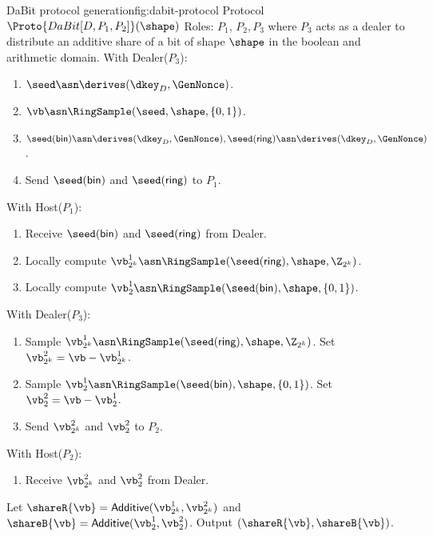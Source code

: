 \begin{Boxfig}{DaBit protocol generation}{fig:dabit-protocol}
  {Protocol $\Proto{DaBit[D, P_1, P_2]}(\shape)$}
  Roles: $P_1$, $P_2, P_3$ where $P_3$ acts as a dealer to distribute
  an additive share of a bit of shape $\shape$ in the boolean and arithmetic domain. \newline
  With Dealer($P_3$):
  \begin{enumerate}
    \item $\seed \asn \derives(\dkey_D, \GenNonce)$.
    \item $\vb \asn \RingSample(\seed, \shape, \{0, 1\})$.
    \item $\seed(\textsf{bin}) \asn \derives(\dkey_D, \GenNonce), \seed(\textsf{ring}) \asn \derives(\dkey_D, \GenNonce)$.
    \item Send $\seed(\textsf{bin})$ and $\seed(\textsf{ring})$ to $P_1$.

  \end{enumerate}
 With Host($P_1$):
 \begin{enumerate}
     \item Receive $\seed(\textsf{bin})$ and $\seed(\textsf{ring})$ from Dealer.
     \item Locally compute $\vb^1_{2^k} \asn \RingSample(\seed(\textsf{ring}), \shape, \Z_{2^k})$.
     \item Locally compute $\vb^1_{2} \asn \RingSample(\seed(\textsf{bin}), \shape, \{0, 1\})$.
 \end{enumerate}
With Dealer($P_3$):
\begin{enumerate}
    \item Sample $\vb^1_{2^k} \asn \RingSample(\seed(\textsf{ring}), \shape, \Z_{2^k})$. Set $\vb^2_{2^k} = \vb - \vb^1_{2^k}$.
    \item Sample $\vb^1_{2} \asn \RingSample(\seed(\textsf{bin}), \shape, \{0, 1\})$. Set $\vb^2_{2} = \vb - \vb^1_{2}$. 
    \item Send $\vb^2_{2^k}$ and $\vb^2_2$ to $P_2$.
\end{enumerate}
With Host($P_2$):
\begin{enumerate}
    \item Receive $\vb^2_{2^k}$ and $\vb^2_2$ from Dealer.
\end{enumerate}
Let $\shareR{\vb} = \textsf{Additive}(\vb^1_{2^k}, \vb^2_{2^k})$ and $\shareB{\vb} = \textsf{Additive}(\vb^1_2, \vb^2_2)$. Output $(\shareR{\vb}, \shareB{\vb})$.
\end{Boxfig}


